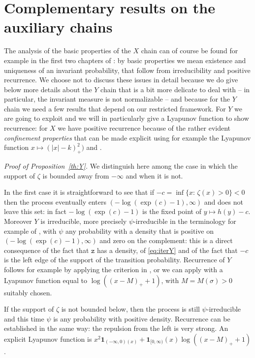 \documentclass[reqno,11pt]{amsart}
\numberwithin{equation}{section}
\newcommand{\ind}{\mathbf{1}}
\newcommand{\gz}{\zeta}
\newcommand{\gs}{\sigma}
\newcommand{\logZ}{\mathtt{z}}
\begin{document}
 
 \appendix

\section{Complementary results on the auxiliary chains}
\label{sec:various}

The   analysis of the basic properties of the $X$ chain can of course be found for example in the first two chapters of \cite{cf:BL}: by basic properties we mean existence and uniqueness of an invariant probability, that follow from  irreducibility and positive recurrence. We choose not to discuss these issues in detail  because we do give below more details about the $Y$ chain that is a bit more delicate to deal with -- in particular, the invariant measure is not normalizable -- and because for the $Y$ chain we need a few  results that depend on our restricted framework. %
For $Y$ we are going to exploit  \cite{cf:MT} and we will in particularly give a Lyapunov function to show recurrence: 
for $X$   we have positive recurrence because of the rather 
evident  \emph{confinement properties}  that can be made explicit using for example the Lyapunov function  $x \mapsto (\vert x\vert -k)_+^2)$ and
  \cite[Th.~11.3.4]{cf:MT}. 

\medskip

\noindent  
\emph{Proof of Proposition~\ref{th:Y}.} We distinguish here  among the case in which the support of $\gz$ is bounded away from $-\infty$ and when it is not. 

In the first case it is straightforward  to see that if $-c= \inf\{x:\, \gz(x)>0\}<0$ then 
the process eventually enters $(-\log(\exp(c) -1), \infty)$ and does not leave this set: in fact 
$-\log(\exp(c) -1)$ is the fixed point of $y\mapsto h(y)-c$.
Moreover $Y$ is irreducible, more precisely $\psi$-irreducible in the terminology for example of \cite{cf:MT},
with $\psi$ any probability with a  density that is positive on $(-\log(\exp(c) -1), \infty)$ and zero on the complement: this is a direct consequence of the fact that $\logZ$ has a density, of \eqref{eq:iterY} and of the fact that $-c$ is the left edge of the support of the transition probability. 
Recurrence of $Y$ follows for example by applying the criterion in \cite[Th.~3.1]{cf:Lamperti60},  or we  can apply %
\cite[Th.~8.0.2]{cf:MT} with a Lyapunov function equal to  $\log ((x-M)_+ +1)$, with $M=M(\gs)>0$ suitably chosen. 

If the support of $\gz$ is not bounded below, then the process is still $\psi$-irreducible and this time $\psi$ is any probability with positive density. Recurrence can be established in the same way: the repulsion from the left is very strong. An explicit Lyapunov function is    $x^2 \ind_{(-\infty, 0) (x)} +\ind_{[0, \infty)}(x) \log ((x-M)_+ +1) $ \cite[Th.~8.0.2]{cf:MT} . 
\end{document}
